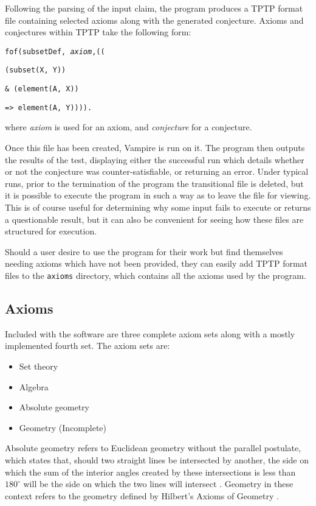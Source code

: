 Following the parsing of the input claim, the program produces a TPTP format file containing selected axioms along with the generated conjecture. Axioms and conjectures within TPTP take the following form:

\texttt{fof(subsetDef, \textit{axiom},((}

\texttt{(subset(X, Y))}

\texttt{\& (element(A, X))}

\texttt{=> element(A, Y)))).}

\noindent
where \textit{axiom} is used for an axiom, and \textit{conjecture} for a conjecture.

Once this file has been created, Vampire is run on it. The program then outputs the results of the test, displaying either the successful run which details whether or not the conjecture was counter-satisfiable, or returning an error. Under typical runs, prior to the termination of the program the transitional file is deleted, but it is possible to execute the program in such a way as to leave the file for viewing. This is of course useful for determining why some input fails to execute or returns a questionable result, but it can also be convenient for seeing how these files are structured for execution.

Should a user desire to use the program for their work but find themselves needing axioms which have not been provided, they can easily add TPTP format files to the \texttt{axioms} directory, which contains all the axioms used by the program.

\subsection{Axioms}

Included with the software are three complete axiom sets along with a mostly implemented fourth set. The axiom sets are:
\begin{itemize}
	\item Set theory
	\item Algebra
	\item Absolute geometry
	\item Geometry (Incomplete)
\end{itemize}

Absolute geometry refers to Euclidean geometry without the parallel postulate, which states that, should two straight lines be intersected by another, the side on which the sum of the interior angles created by these intersections is less than $180^{\circ}$ will be the side on which the two lines will intersect \cite{absolute}. Geometry in these context refers to the geometry defined by Hilbert's Axioms of Geometry \cite{Hilbert}.

